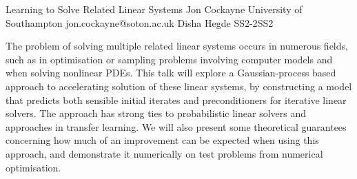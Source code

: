 \begin{talk}
  {Learning to Solve Related Linear Systems}%
  {Jon Cockayne}%
  {University of Southampton}%
  {jon.cockayne@soton.ac.uk}%
  {Disha Hegde}%
{}{}{SS2-2}{SS2}

			
The problem of solving multiple related linear systems occurs in numerous fields, such as in optimisation or sampling problems involving computer models and when solving nonlinear PDEs. This talk will explore a Gaussian-process based approach to accelerating solution of these linear systems, by constructing a model that predicts both sensible initial iterates and preconditioners for iterative linear solvers. The approach has strong ties to probabilistic linear solvers and approaches in transfer learning. We will also present some theoretical guarantees concerning how much of an improvement can be expected when using this approach, and demonstrate it numerically on test problems from numerical optimisation.

\end{talk}

